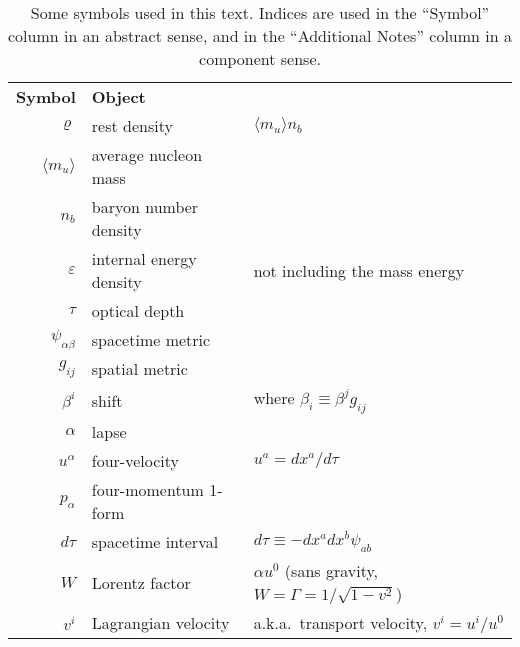 \begin{table}
  \centering
  \begin{tabular}{rll}
    \textbf{Symbol}       & \textbf{Object}           & \\%
    $\varrho$             & rest density              & $\langle m_u \rangle n_b $ \\
    $\langle m_u \rangle$ & average nucleon mass      & \\
    $n_b$                 & baryon number density     & \\
    $\varepsilon$         & internal energy density   & not including the mass energy \\
    $\tau$                & optical depth             & \\
    $\psi_{\alpha\beta}$  & spacetime metric          & \\
    $g_{ij}$              & spatial metric            & \\
    $\beta^i$             & shift                     & where $\beta_i \equiv \beta^j g_{ij}$ \\
    $\alpha$              & lapse                     & \\
    $u^\alpha$            & four-velocity             & $u^a=dx^a/d\tau$ \\
    $p_\alpha$            & four-momentum 1-form      & \\
    $d\tau$               & spacetime interval        & $d\tau\equiv-dx^a dx^b \psi_{ab}$ \\
    $W$                   & Lorentz factor            & $\alpha u^0$ (sans gravity, $W=\Gamma=1/\sqrt{1-v^2}$) \\
    $v^i$                 & Lagrangian velocity       & a.k.a.\ transport velocity, $v^i=u^i/u^0$ \\
  \end{tabular}
  \caption[Symbols used in the text]{
    Some symbols used in this text.
    Indices are used in the ``Symbol'' column in an abstract sense, and in the
    ``Additional Notes'' column in a component sense.
  }
  \label{tab:conventions}
\end{table}
